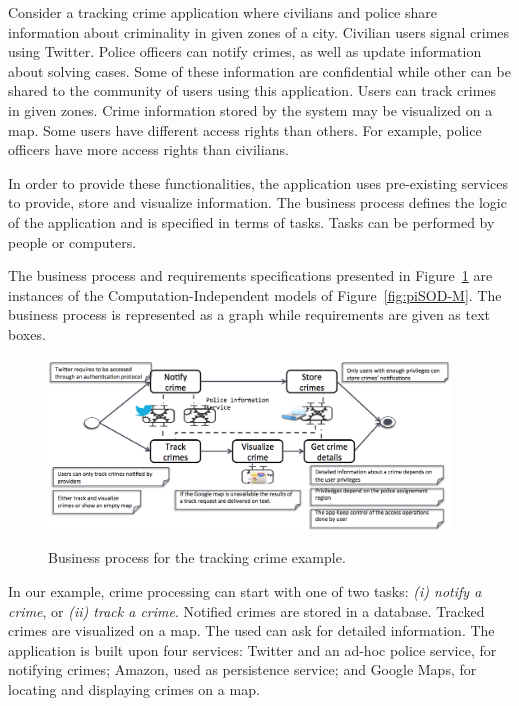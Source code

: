
Consider a tracking crime application where civilians and police share information about criminality in given zones of a city. 
Civilian users signal crimes using Twitter.
Police officers can notify crimes, as well as update information about solving cases.
Some of these information are confidential while other can be shared
to the community of users using this application. 
Users can track crimes in given zones. 
Crime information stored by the system may be visualized on a map. 
Some users have different access rights than others.
For example, police officers have more access rights than civilians.


In order to provide these functionalities, the application uses pre-existing services to provide, store and visualize  information.
The business process defines the logic of the application and is specified in terms of tasks. 
Tasks can be performed by people or computers. 

The business process and requirements specifications presented in Figure~\ref{fig:constraints} are instances of the Computation-Independent models of Figure~\ref{fig:piSOD-M}.
The business process is represented as a graph while requirements are given as text boxes.
\begin{figure}[ht!]
\centering
{\label{fig:trans06}\includegraphics[width=0.95\textwidth]{figs/constraints}}
~ %
\caption{Business process for the tracking crime example.}
\label{fig:constraints}
\end{figure}

In our example, crime processing can start with one of two tasks: \textit{(i) notify a crime}, or \textit{(ii) track a crime}.
Notified crimes are stored in a database. 
Tracked crimes are visualized on a map.
The used can ask for detailed information. 
The application is built upon four services: \textsf{Twitter} and an \textsf{ad-hoc police service}, for notifying crimes; \textsf{Amazon}, used as  persistence service; and  \textsf{Google Maps}, for locating and displaying crimes on a map.

